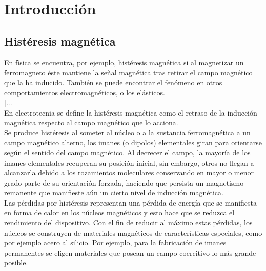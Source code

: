 \documentclass[]{article}
\begin{document}
	
	 
	

	
	
		
	\section{Introducción}
	
	\subsection{Histéresis magnética}

En física se encuentra, por ejemplo, histéresis magnética si al magnetizar un ferromagneto éste mantiene la señal magnética tras retirar el campo magnético que la ha inducido. También se puede encontrar el fenómeno en otros comportamientos electromagnéticos, o los elásticos.\\

[...]\\

En electrotecnia se define la histéresis magnética como el retraso de la inducción magnética respecto al campo magnético que lo acciona.\\

Se produce histéresis al someter al núcleo o a la sustancia ferromagnética a un campo magnético alterno, los imanes (o dipolos) elementales giran para orientarse según el sentido del campo magnético. Al decrecer el campo, la mayoría de los imanes elementales recuperan su posición inicial, sin embargo, otros no llegan a alcanzarla debido a los rozamientos moleculares conservando en mayor o menor grado parte de su orientación forzada, haciendo que persista un magnetismo remanente que manifieste aún un cierto nivel de inducción magnética.\\

Las pérdidas por histéresis representan una pérdida de energía que se manifiesta en forma de calor en los núcleos magnéticos y esto hace que se reduzca el rendimiento del dispositivo. Con el fin de reducir al máximo estas pérdidas, los núcleos se construyen de materiales magnéticos de características especiales, como por ejemplo acero al silicio. Por ejemplo, para la fabricación de imanes permanentes se eligen materiales que posean un campo coercitivo lo más grande posible.\\
\end{document}
